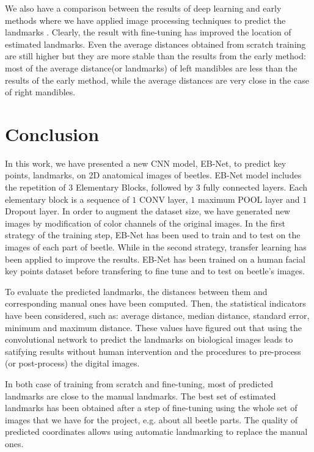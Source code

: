 \documentclass[review]{elsarticle}
\begin{document}
We also have a comparison between the results of deep learning and
early methods where we have applied image processing techniques to
predict the landmarks \cite{le2017maelab}. Clearly, the result with
fine-tuning has improved the location of estimated landmarks. Even the
average distances obtained from scratch training are still higher but
they are more stable than the results from the early method: most of
the average distance(or landmarks) of left mandibles are less than the
results of the early method, while the average distances are very
close in the case of right mandibles.

\section{Conclusion}
\label{sconclusion}
In this work, we have presented a new CNN model, EB-Net, to predict
key points, landmarks, on 2D anatomical images of beetles. EB-Net
model includes the repetition of $3$ Elementary Blocks, followed by
$3$ fully connected layers. Each elementary block is a sequence of $1$
CONV layer, $1$ maximum POOL layer and $1$ Dropout layer. In order to
augment the dataset size, we have generated new images by modification
of color channels of the original images. In the first strategy of the training step, EB-Net has been used to train and to test on the images of each part of beetle. While in the second strategy, transfer learning has been applied to improve the results. EB-Net has been trained on a human facial key points dataset before transfering to fine tune and to test on beetle's images.

To evaluate the predicted landmarks, the distances between them and corresponding manual ones have been computed. Then, the statistical indicators have been considered, such as: average distance, median distance, standard error, minimum and maximum distance. These values have figured out that using the convolutional network to predict the landmarks on biological images leads to satifying results without human intervention and the procedures to pre-process (or post-process) the digital images. 

In both case of training from scratch and fine-tuning, most of predicted landmarks are close to the manual landmarks. The best set of estimated landmarks has been obtained after a step of fine-tuning using the whole set of images that we have for the
project, e.g. about all beetle parts. The quality of predicted coordinates allows using automatic landmarking to replace the manual ones.
\end{document}
